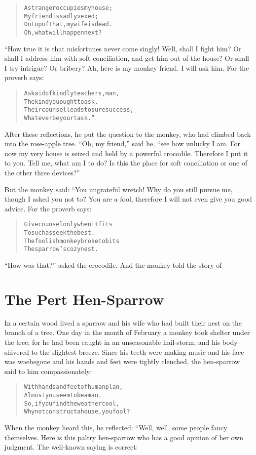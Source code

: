 \documentclass[article, twoside, 14pt]{memoir}
\renewenvironment{verbatim}{%
\begin{quote}%
\vskip -10pt%
\begin{alltt}\normalfont\large}{\end{alltt}%
\end{quote}%
\vskip -10pt
} %
\begin{document}
\begin{verbatim}
A stranger occupies my house;
    My friend is sadly vexed;
On top of that, my wife is dead.
    Oh, what will happen next?
\end{verbatim}
“How true it is that misfortunes never come singly! Well,
shall I fight him? Or shall I address him with soft conciliation,
and get him out of the house? Or shall I try intrigue? Or bribery?
Ah, here is my monkey friend. I will ask him. For the proverb
says:

\begin{verbatim}
Ask aid of kindly teachers, man,
    The kind you ought to ask.
Their counsel leads to sure success,
    Whatever be your task.”
\end{verbatim}
After these reflections, he put the question to the monkey, who had
climbed back into the rose-apple tree. ``Oh, my friend,'' said he,
``see how unlucky I am. For now my very house is seized and held by a powerful crocodile. Therefore I put it to you. Tell me, what am I to do? Is this the place for soft conciliation or one of the other three devices?''

But the monkey said: “You ungrateful wretch! Why do you still
pursue me, though I asked you not to? You are a fool, therefore I
will not even give you good advice. For the proverb says:

\begin{verbatim}
Give counsel only when it fits
    To such as seek the best.
The foolish monkey broke to bits
    The sparrow's cozy nest.
\end{verbatim}
``How was that?'' asked the crocodile. And the monkey told the
story of

\chapter{The Pert Hen-Sparrow}

\label{s75}

In a certain wood lived a sparrow and his wife who had built their
nest on the branch of a tree. One day in the month of February a
monkey took shelter under the tree; for he had been caught in an
unseasonable hail-storm, and his body shivered to the slightest
breeze. Since his teeth were making music and his face was
woebegone and his hands and feet were tightly clenched, the
hen-sparrow said to him compassionately:

\begin{verbatim}
With hands and feet of human plan,
Almost you seem to be a man.
So, if you find the weather cool,
Why not construct a house, you fool?
\end{verbatim}
When the monkey heard this, he reflected: “Well, well, some people
fancy themselves. Here is this paltry hen-sparrow who has a good
opinion of her own judgment. The well-known saying is correct:
\end{document}
